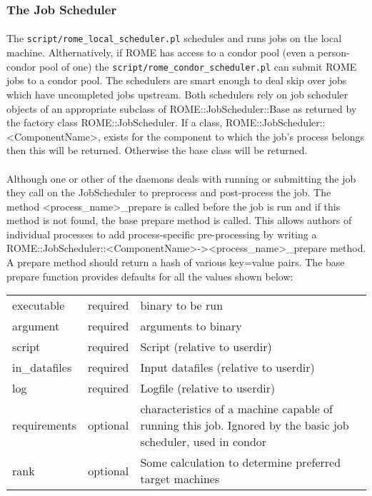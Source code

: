 \subsubsection{The Job Scheduler}
\label{sec:job_scheduling}

\paragraph{}
The \texttt{script/rome\_local\_scheduler.pl} schedules and runs jobs on the local machine. Althernatively, if ROME has access to a condor pool (even a person-condor pool of one) the \texttt{script/rome\_condor\_scheduler.pl} can submit ROME jobs to a condor pool. The schedulers are smart enough to deal skip over jobs which have uncompleted jobs upstream. Both schedulers rely on job scheduler objects of an appropriate subclass of ROME::JobScheduler::Base as returned by the factory class ROME::JobScheduler. If a class, ROME::JobScheduler::<ComponentName>, exists for the component to which the job's process belongs then this will be returned. Otherwise the base class will be returned. 

\paragraph{}
Although one or other of the daemons deals with running or submitting the job they call on the JobScheduler to preprocess and post-process the job. The method <process\_name>\_prepare is called before the job is run and if this method is not found, the base prepare method is called. This allows authors of individual processes to add process-specific pre-processing by writing a ROME::JobScheduler::<ComponentName>-><process\_name>\_prepare method. A prepare method should return a hash of various key=value pairs. The base prepare function provides defaults for all the values shown below:

\begin{scriptsize}
\begin{tabular}{l|c|l}
executable & required & binary to be run \\
argument&required&arguments to binary\\
script&required&Script (relative to userdir)\\
in\_datafiles&required&Input datafiles (relative to userdir)\\
log&required&Logfile (relative to userdir)\\
requirements&optional&characteristics of a machine capable of running this job. Ignored by the basic job scheduler, used in condor\\
rank&optional&Some calculation to determine preferred target machines \\
\end{tabular}
\end{scriptsize}

